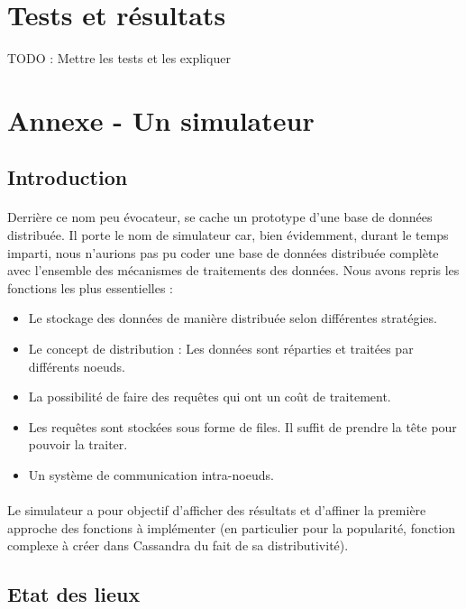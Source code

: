 \documentclass[12pt]{article}
\begin{document}
\section{Tests et résultats}

TODO : Mettre les tests et les expliquer

\section{Annexe - Un simulateur}

\subsection{Introduction}

\paragraph{}Derrière ce nom peu évocateur, se cache un prototype d'une base de données distribuée. Il porte le nom de simulateur car, bien évidemment, durant le temps imparti, nous n'aurions pas pu coder une base de données distribuée complète avec l'ensemble des mécanismes de traitements des données. Nous avons repris les fonctions les plus essentielles :

\begin{itemize}
    \item Le stockage des données de manière distribuée selon différentes stratégies.
    \item Le concept de distribution : Les données sont réparties et traitées par différents noeuds.
    \item La possibilité de faire des requêtes qui ont un coût de traitement.
    \item Les requêtes sont stockées sous forme de files. Il suffit de prendre la tête pour pouvoir la traiter.
    \item Un système de communication intra-noeuds.
\end{itemize}

\paragraph{}Le simulateur a pour objectif d'afficher des résultats et d'affiner la première approche des fonctions à implémenter (en particulier pour la popularité, fonction complexe à créer dans Cassandra du fait de sa distributivité).

\subsection{Etat des lieux}
\end{document}
